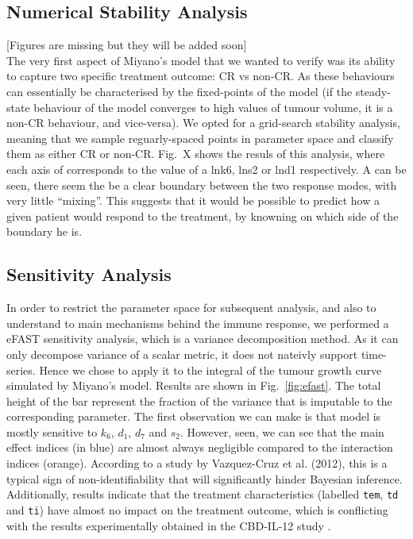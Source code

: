 \documentclass[11pt]{article}
\begin{document}
\subsection{Numerical Stability Analysis}
[Figures are missing but they will be added soon]\\
The very first aspect of Miyano's model that we wanted to verify was its ability to capture two specific treatment outcome: CR vs non-CR. As these behaviours can essentially be characterised by the fixed-points of the model (if the steady-state behaviour of the model converges to high values of tumour volume, it is a non-CR behaviour, and vice-versa). We opted for a grid-search stability analysis, meaning that we sample reguarly-spaced points in parameter space and classify them as either CR or non-CR. Fig.~X shows the resuls of this analysis, where each axis of corresponds to the value of a lnk6, lns2 or lnd1 respectively. A can be seen, there seem the be a clear boundary between the two response modes, with very little ``mixing''. This suggests that it would be possible to predict how a given patient would respond to the treatment, by knowning on which side of the boundary he is.

\subsection{Sensitivity Analysis}
In order to restrict the parameter space for subsequent analysis, and also to understand to main mechanisms behind the immune response, we performed a eFAST sensitivity analysis, which is a variance decomposition method. As it can only decompose variance of a scalar metric, it does not nateivly support time-series. Hence we chose to apply it to the integral of the tumour growth curve simulated by Miyano's model. Results are shown in Fig.~\ref{fig:efast}. The total height of the bar represent the fraction of the variance that is imputable to the corresponding parameter. The first observation we can make is that model is mostly sensitive to $k_6$, $d_1$, $d_7$ and $s_2$. However, seen, we can see that the main effect indices (in blue) are almost always negligible compared to the interaction indices (orange). According to a study by Vazquez-Cruz et al. (2012), this is a typical sign of non-identifiability \cite{tomgro} that will significantly hinder Bayesian inference. Additionally, results indicate that the treatment characteristics (labelled \verb+tem+, \verb+td+ and \verb+ti+) have almost no impact on the treatment outcome, which is conflicting with the results experimentally obtained in the CBD-IL-12 study \cite{cbdil12}. 
\end{document}
